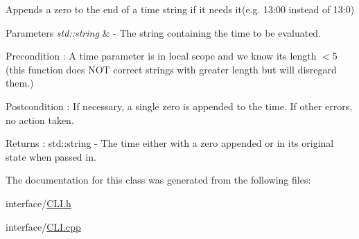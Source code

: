 Appends a zero to the end of a time string if it needs it(e.\+g. 13\+:00 instead of 13\+:0) 
\begin{DoxyParams}{Parameters}
{\em std\+::string} & -\/ The string containing the time to be evaluated. \\
\hline
\end{DoxyParams}
\begin{DoxyPrecond}{Precondition}
\+: A time parameter is in local scope and we know it\textquotesingle{}s length $<$5 (this function does N\+OT correct strings with greater length but will disregard them.) 
\end{DoxyPrecond}
\begin{DoxyPostcond}{Postcondition}
\+: If necessary, a single zero is appended to the time. If other errors, no action taken. 
\end{DoxyPostcond}
\begin{DoxyReturn}{Returns}
\+: std\+::string -\/ The time either with a zero appended or in it\textquotesingle{}s original state when passed in. 
\end{DoxyReturn}


The documentation for this class was generated from the following files\+:\begin{DoxyCompactItemize}
\item 
interface/\mbox{\hyperlink{_c_l_i_8h}{C\+L\+I.\+h}}\item 
interface/\mbox{\hyperlink{_c_l_i_8cpp}{C\+L\+I.\+cpp}}\end{DoxyCompactItemize}
